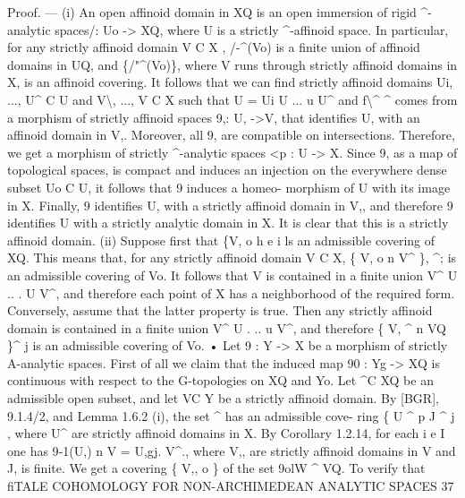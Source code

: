 \documentclass[
  10pt,
]{article}
\newenvironment{Shaded}{}{}
\newcommand{\NormalTok}[1]{#1}
\begin{document}
\begin{Shaded}
\begin{Highlighting}[]
\NormalTok{       Proof. — (i) An open affinoid domain in XQ is an open immersion of rigid \^{}{-}analytic}
\NormalTok{spaces/: Uo {-}\textgreater{} XQ, where U is a strictly \^{}{-}affinoid space. In particular, for any strictly}
\NormalTok{affinoid domain V C X , /{-}\^{}(Vo) is a finite union of affinoid domains in UQ, and}
\NormalTok{\{/"\^{}(Vo)\}, where V runs through strictly affinoid domains in X, is an affinoid covering.}
\NormalTok{It follows that we can find strictly affinoid domains Ui, ..., U\^{} C U and V\textbackslash{}, ..., V C X}
\NormalTok{such that U = Ui U ... u U\^{} and f\textbackslash{}\^{} \^{} comes from a morphism of strictly affinoid}
\NormalTok{spaces 9,: U, {-}\textgreater{}V, that identifies U, with an affinoid domain in V,. Moreover, all 9,}
\NormalTok{are compatible on intersections. Therefore, we get a morphism of strictly \^{}{-}analytic}
\NormalTok{spaces \textless{}p : U {-}\textgreater{} X. Since 9, as a map of topological spaces, is compact and induces an}
\NormalTok{injection on the everywhere dense subset Uo C U, it follows that 9 induces a homeo{-}}
\NormalTok{morphism of U with its image in X. Finally, 9 identifies U, with a strictly affinoid}
\NormalTok{domain in V,, and therefore 9 identifies U with a strictly analytic domain in X. It is}
\NormalTok{clear that this is a strictly affinoid domain.}
\NormalTok{       (ii) Suppose first that \{V, o h e i ls an admissible covering of XQ. This means}
\NormalTok{that, for any strictly affinoid domain V C X, \{ V, o n V\^{} \}, \^{}; is an admissible covering}
\NormalTok{of Vo. It follows that V is contained in a finite union V\^{} U .. . U V\^{}, and therefore}
\NormalTok{each point of X has a neighborhood of the required form. Conversely, assume that}
\NormalTok{the latter property is true. Then any strictly affinoid domain is contained in a finite}
\NormalTok{union V\^{} U . .. u V\^{}, and therefore \{ V, \^{} n VQ \}\^{} j is an admissible covering of Vo. •}
\NormalTok{       Let 9 : Y {-}\textgreater{} X be a morphism of strictly A{-}analytic spaces. First of all we claim}
\NormalTok{that the induced map 90 : Yg {-}\textgreater{} XQ is continuous with respect to the G{-}topologies on XQ}
\NormalTok{and Yo. Let \^{}C XQ be an admissible open subset, and let VC Y be a strictly affinoid}
\NormalTok{domain. By [BGR], 9.1.4/2, and Lemma 1.6.2 (i), the set \^{} has an admissible cove{-}}
\NormalTok{ring \{ U \^{} p J \^{} j , where U\^{} are strictly affinoid domains in X. By Corollary 1.2.14,}
\NormalTok{for each i e I one has 9{-}1(U,) n V = U,gj. V\^{}., where V,, are strictly affinoid domains}
\NormalTok{in V and J, is finite. We get a covering \{ V,, o \} of the set 9o\textquotesingle{}lW \^{} VQ. To verify that}
\NormalTok{            fiTALE COHOMOLOGY FOR NON{-}ARCHIMEDEAN ANALYTIC SPACES                             37}


\end{Highlighting}
\end{Shaded}
\end{document}

